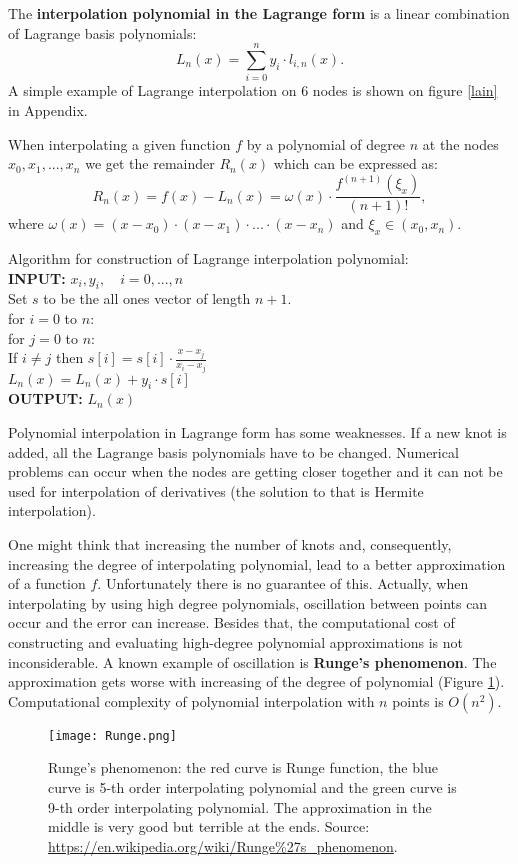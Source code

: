 \documentclass[a4paper,10pt]{article}
\begin{document}
The \textbf{interpolation polynomial in the Lagrange form} is a linear combination of Lagrange basis polynomials:
$$L_n(x)=\sum_{i=0}^{n}{y_i\cdot l_{i,n}(x)}.$$
A simple example of Lagrange interpolation on 6 nodes is shown on figure \ref{lain} in Appendix. \cite{lagr}

When interpolating a given function $f$ by a polynomial of degree $n$ at the nodes $x_0, x_1,...,x_n$ we get the remainder $R_n(x)$ which can be expressed as:
$$R_n(x)=f(x)-L_n(x)=\omega (x) \cdot \frac{f^{(n+1)}(\xi_x)}{(n+1)!},$$ where $\omega(x)=(x-x_0)\cdot (x-x_1)\cdot ... \cdot (x-x_n)$ and $\xi_x \in (x_0,x_n)$. \cite{lagr}

Algorithm for construction of Lagrange interpolation polynomial:\\
\textbf{INPUT:} $x_i, y_i, \quad i=0,...,n$ \\
Set $s$ to be the all ones vector of length $n+1$.\\
for $i=0$ to $n$: \\
\indent for $j=0$ to $n$:\\
\indent \indent If $i \neq j$ then $s[i]=s[i] \cdot \frac{x-x_j}{x_i-x_j}$\\
\indent $L_n(x)=L_n(x)+y_i \cdot s[i]$\\
\textbf{OUTPUT:} $L_n(x)$

Polynomial interpolation in Lagrange form has some weaknesses. If a new knot is added, all the Lagrange basis polynomials have to be changed. Numerical problems can occur when the nodes are getting closer together and it 
can not be used for interpolation of derivatives (the solution to that is Hermite interpolation).

One might think that increasing the number of knots and, consequently, increasing the degree of interpolating polynomial, lead to a better approximation of a function $f$. Unfortunately there is no guarantee of this. Actually, when interpolating by using high degree polynomials, oscillation between points can occur and the error can increase. Besides that, the computational cost of constructing and evaluating high-degree polynomial approximations is not inconsiderable. A known example of oscillation is \textbf{Runge's phenomenon}. The approximation gets worse with increasing of the degree of polynomial (Figure \ref{rphenom}). Computational complexity of polynomial interpolation with $n$ points is $O(n^2)$. \cite{Liao}
\begin{figure}[h!]
\centering
\texttt{[image: Runge.png]}
\caption{Runge's phenomenon: the red curve is Runge function, the blue curve is 5-th order interpolating polynomial and the green curve is 9-th order interpolating polynomial. The approximation in the middle is very good but terrible at the ends.
Source: \protect\url{https://en.wikipedia.org/wiki/Runge\%27s_phenomenon}.}
\label{rphenom}
\end{figure}
\end{document}
